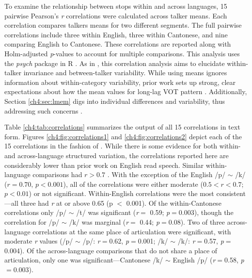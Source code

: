 To examine the relationship between stops within and across languages, 15 pairwise Pearson's \textit{r} correlations were calculated across talker means. Each correlation compares talkers means for two different segments. The full pairwise correlations include three within English, three within Cantonese, and nine comparing English to Cantonese. These correlations are reported along with Holm-adjusted \textit{p}-values to account for multiple comparisons. This analysis uses the \textit{psych} \citep{revelle_2021_psych} package in R \citep{r_2021}. As in \citet{chodroff_2017_structure}, this correlation analysis aims to elucidate within-talker invariance and between-talker variability. While using means ignores information about within-category variability, prior work sets up strong, clear expectations about how the mean values for long-lag VOT pattern \citep{chodroff_2017_structure, cho_1999_vot}. Additionally, Section \ref{ch4:sec:lmem} digs into individual differences and variability, thus addressing such concerns \citep[see][]{haines_2020_theoretically}.

Table \ref{ch4:tab:correlations} summarizes the output of all 15 correlations in text form. Figures \ref{ch4:fig:correlations1} and \ref{ch4:fig:correlations2} depict each of the 15 correlations in the fashion of \cite{chodroff_2017_structure}. While there is some evidence for both within- and across-language structured variation, the correlations reported here are considerably lower than prior work on English read speech. Similar within-language comparisons had $r>0.7$ \citep{chodroff_2017_structure, chodroff_2019_l2}. With the exception of the English /p/ $\sim$ /k/ ($r=0.70$, $p<0.001$), all of the correlations were either moderate ($0.5<r<0.7$; $p<0.01$) or not significant. Within-English correlations were the most consistent---all three had \textit{r} at or above 0.65 (p $<$ 0.001). Of the within-Cantonese correlations only /p/ $\sim$ /t/ was significant (\textit{r}$=$ 0.59; \textit{p}$=$0.003), though the correlation for /p/ $\sim$ /k/ was marginal (\textit{r}$=$ 0.44; \textit{p}$=$0.08). Two of three across-language correlations at the same place of articulation were significant, with moderate \textit{r} values (/p/ $\sim$ /p/: \textit{r}$=$0.62, \textit{p}$=$0.001; /k/ $\sim$ /k/: \textit{r}$=$0.57, \textit{p}$=$0.004). Of the across-language comparisons that do not share a place of articulation, only one was significant---Cantonese /k/ $\sim$ English /p/ (\textit{r}$=$0.58, \textit{p}$=$0.003).


